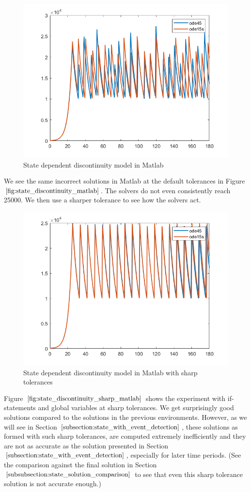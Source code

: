 \begin{figure}[h]
\centering
\includegraphics[width=0.7\linewidth]{./figures/state_discontinuity_matlab}
\caption{State dependent discontinuity model in Matlab}
\label{fig:state_discontinuity_matlab}
\end{figure}
We see the same incorrect solutions in Matlab at the default tolerances in Figure $\ref{fig:state_discontinuity_matlab}$. The solvers do not even consistently reach 25000. We then use a sharper tolerance to see how the solvers act.

\begin{figure}[h]
\centering
\includegraphics[width=0.7\linewidth]{./figures/state_discontinuity_sharp_matlab}
\caption{State dependent discontinuity model in Matlab with sharp tolerances}
\label{fig:state_discontinuity_sharp_matlab}
\end{figure}

Figure $\ref{fig:state_discontinuity_sharp_matlab}$ shows the experiment with if-statements and global variables at sharp tolerances. We get surprisingly good solutions compared to the solutions in the previous environments. However, as we will see in Section $\ref{subsection:state_with_event_detection}$, these solutions as formed with such sharp tolerances, are computed extremely inefficiently and they are not as accurate as the solution presented in Section $\ref{subsection:state_with_event_detection}$, especially for later time periods. (See the comparison against the final solution in Section $\ref{subsubsection:state_solution_comparison}$ to see that even this sharp tolerance solution is not accurate enough.)


